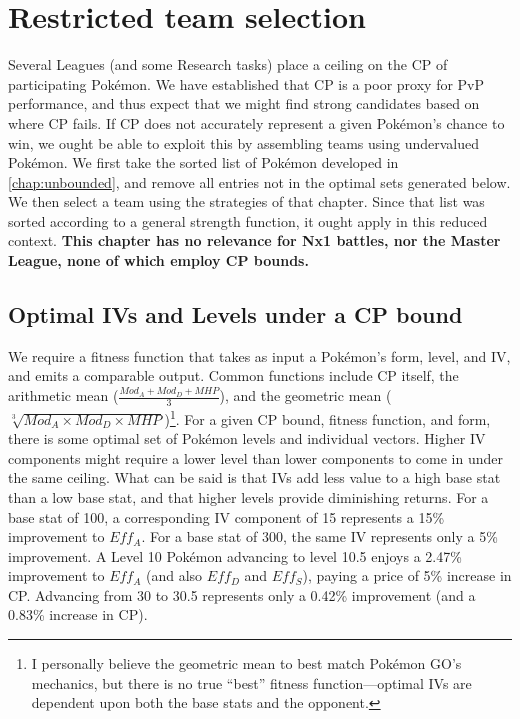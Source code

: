 \chapter{Restricted team selection}
\label{chap:bounded}
Several Leagues (and some Research tasks) place a ceiling on the CP of
 participating Pokémon.
We have established that CP is a poor proxy for PvP performance, and thus
 expect that we might find strong candidates based on where CP fails.
If CP does not accurately represent a given Pokémon's chance to win, we ought
 be able to exploit this by assembling teams using undervalued Pokémon.
We first take the sorted list of Pokémon developed in \autoref{chap:unbounded},
 and remove all entries not in the optimal sets generated below.
We then select a team using the strategies of that chapter. Since
 that list was sorted according to a general strength function, it
 ought apply in this reduced context.
\textbf{This chapter has no relevance for Nx1 battles, nor the Master
  League, none of which employ CP bounds.}

\section{Optimal IVs and Levels under a CP bound}
We require a fitness function that takes as input a Pokémon's form, level, and IV,
  and emits a comparable output.
Common functions include CP itself, the arithmetic mean ($\frac{Mod_A + Mod_D + MHP}{3}$),
  and the geometric mean ($\sqrt[3]{Mod_A \times Mod_D \times MHP}$)\footnote{I personally believe the geometric mean to best match Pokémon GO's
  mechanics, but there is no true ``best'' fitness function---optimal IVs are
  dependent upon both the base stats and the opponent.}.
For a given CP bound, fitness function, and form, there is some optimal set of Pokémon levels
 and individual vectors.
Higher IV components might require a lower level than lower components to
 come in under the same ceiling.
What can be said is that IVs add less value to a high base stat than a low
 base stat, and that higher levels provide diminishing returns.
For a base stat of 100, a corresponding IV component of 15 represents a
 15\% improvement to $Eff_A$.
For a base stat of 300, the same IV represents only a 5\% improvement.
A Level 10 Pokémon advancing to level 10.5 enjoys a 2.47\% improvement to
 $Eff_A$ (and also $Eff_D$ and $Eff_S$), paying a price of 5\% increase
 in CP.
Advancing from 30 to 30.5 represents only a 0.42\% improvement (and a
 0.83\% increase in CP).

